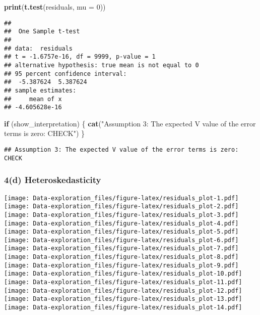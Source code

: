 \documentclass[
]{article}
\newenvironment{Shaded}{\begin{snugshade}}{\end{snugshade}}
\newcommand{\AttributeTok}[1]{\textcolor[rgb]{0.13,0.29,0.53}{#1}}
\newcommand{\ControlFlowTok}[1]{\textcolor[rgb]{0.13,0.29,0.53}{\textbf{#1}}}
\newcommand{\DecValTok}[1]{\textcolor[rgb]{0.00,0.00,0.81}{#1}}
\newcommand{\FunctionTok}[1]{\textcolor[rgb]{0.13,0.29,0.53}{\textbf{#1}}}
\newcommand{\NormalTok}[1]{#1}
\newcommand{\StringTok}[1]{\textcolor[rgb]{0.31,0.60,0.02}{#1}}
\begin{document}
\begin{Shaded}
\begin{Highlighting}[]
\FunctionTok{print}\NormalTok{(}\FunctionTok{t.test}\NormalTok{(residuals, }\AttributeTok{mu =} \DecValTok{0}\NormalTok{))}
\end{Highlighting}
\end{Shaded}

\begin{verbatim}
## 
##  One Sample t-test
## 
## data:  residuals
## t = -1.6757e-16, df = 9999, p-value = 1
## alternative hypothesis: true mean is not equal to 0
## 95 percent confidence interval:
##  -5.387624  5.387624
## sample estimates:
##     mean of x 
## -4.605628e-16
\end{verbatim}

\begin{Shaded}
\begin{Highlighting}[]
\ControlFlowTok{if}\NormalTok{ (show\_interpretation) \{}
  \FunctionTok{cat}\NormalTok{(}\StringTok{"Assumption 3: The expected V value of the error terms is zero: CHECK"}\NormalTok{)}
\NormalTok{\}}
\end{Highlighting}
\end{Shaded}

\begin{verbatim}
## Assumption 3: The expected V value of the error terms is zero: CHECK
\end{verbatim}

\subsubsection{\texorpdfstring{\textbf{4(d)
Heteroskedasticity}}{4(d) Heteroskedasticity}}\label{d-heteroskedasticity}

\texttt{[image: Data-exploration\_files/figure-latex/residuals\_plot-1.pdf]}
\texttt{[image: Data-exploration\_files/figure-latex/residuals\_plot-2.pdf]}
\texttt{[image: Data-exploration\_files/figure-latex/residuals\_plot-3.pdf]}
\texttt{[image: Data-exploration\_files/figure-latex/residuals\_plot-4.pdf]}
\texttt{[image: Data-exploration\_files/figure-latex/residuals\_plot-5.pdf]}
\texttt{[image: Data-exploration\_files/figure-latex/residuals\_plot-6.pdf]}
\texttt{[image: Data-exploration\_files/figure-latex/residuals\_plot-7.pdf]}
\texttt{[image: Data-exploration\_files/figure-latex/residuals\_plot-8.pdf]}
\texttt{[image: Data-exploration\_files/figure-latex/residuals\_plot-9.pdf]}
\texttt{[image: Data-exploration\_files/figure-latex/residuals\_plot-10.pdf]}
\texttt{[image: Data-exploration\_files/figure-latex/residuals\_plot-11.pdf]}
\texttt{[image: Data-exploration\_files/figure-latex/residuals\_plot-12.pdf]}
\texttt{[image: Data-exploration\_files/figure-latex/residuals\_plot-13.pdf]}
\texttt{[image: Data-exploration\_files/figure-latex/residuals\_plot-14.pdf]}
\end{document}
